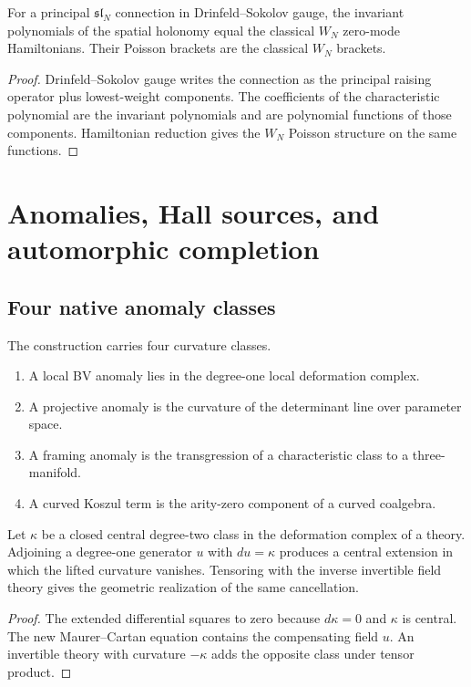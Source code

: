 \begin{theorem}
For a principal $\mathfrak{sl}_N$ connection in Drinfeld--Sokolov gauge, the invariant polynomials of the spatial holonomy equal the classical $W_N$ zero-mode Hamiltonians.  Their Poisson brackets are the classical $W_N$ brackets.
\end{theorem}
\begin{proof}
Drinfeld--Sokolov gauge writes the connection as the principal raising operator plus lowest-weight components.  The coefficients of the characteristic polynomial are the invariant polynomials and are polynomial functions of those components.  Hamiltonian reduction gives the $W_N$ Poisson structure on the same functions.
\end{proof}


\part{Anomalies, Hall sources, and automorphic completion}

\chapter{Four native anomaly classes}
The construction carries four curvature classes.
\begin{enumerate}
\item A local BV anomaly lies in the degree-one local deformation complex.
\item A projective anomaly is the curvature of the determinant line over parameter space.
\item A framing anomaly is the transgression of a characteristic class to a three-manifold.
\item A curved Koszul term is the arity-zero component of a curved coalgebra.
\end{enumerate}

\begin{theorem}
Let $\kappa$ be a closed central degree-two class in the deformation complex of a theory.  Adjoining a degree-one generator $u$ with $du=\kappa$ produces a central extension in which the lifted curvature vanishes.  Tensoring with the inverse invertible field theory gives the geometric realization of the same cancellation.
\end{theorem}
\begin{proof}
The extended differential squares to zero because $d\kappa=0$ and $\kappa$ is central.  The new Maurer--Cartan equation contains the compensating field $u$.  An invertible theory with curvature $-\kappa$ adds the opposite class under tensor product.
\end{proof}


